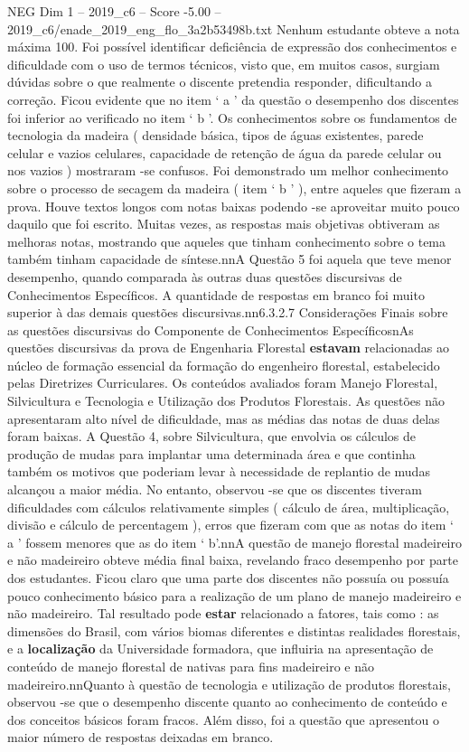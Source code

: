 \begin{textsample}{NEG Dim 1 – 2019\_c6 – Score -5.00 – 2019\_c6/enade\_2019\_eng\_flo\_3a2b53498b.txt}
Nenhum estudante obteve a nota máxima 100.
Foi possível identificar deficiência de expressão dos conhecimentos e dificuldade com o uso de termos técnicos, visto que, em muitos casos, surgiam dúvidas sobre o que realmente o discente pretendia responder, dificultando a correção.
Ficou evidente que no item ‘ a ’ da questão o desempenho dos discentes foi inferior ao verificado no item ‘ b ’.
Os conhecimentos sobre os fundamentos de tecnologia da madeira ( densidade básica, tipos de águas existentes, parede celular e vazios celulares, capacidade de retenção de água da parede celular ou nos vazios ) mostraram -se confusos.
Foi demonstrado um melhor conhecimento sobre o processo de secagem da madeira ( item ‘ b ’ ), entre aqueles que fizeram a prova.
Houve textos longos com notas baixas podendo -se aproveitar muito pouco daquilo que foi escrito.
Muitas vezes, as respostas mais objetivas obtiveram as melhoras notas, mostrando que aqueles que tinham conhecimento sobre o tema também tinham capacidade de síntese.nnA Questão 5 foi aquela que teve menor desempenho, quando comparada às outras duas questões discursivas de Conhecimentos Específicos.
A quantidade de respostas em branco foi muito superior à das demais questões discursivas.nn6.3.2.7 Considerações Finais sobre as questões discursivas do Componente de Conhecimentos EspecíficosnAs questões discursivas da prova de Engenharia Florestal \textbf{estavam} relacionadas ao núcleo de formação essencial da formação do engenheiro florestal, estabelecido pelas Diretrizes Curriculares.
Os conteúdos avaliados foram Manejo Florestal, Silvicultura e Tecnologia e Utilização dos Produtos Florestais.
As questões não apresentaram alto nível de dificuldade, mas as médias das notas de duas delas foram baixas.
A Questão 4, sobre Silvicultura, que envolvia os cálculos de produção de mudas para implantar uma determinada área e que continha também os motivos que poderiam levar à necessidade de replantio de mudas alcançou a maior média.
No entanto, observou -se que os discentes tiveram dificuldades com cálculos relativamente simples ( cálculo de área, multiplicação, divisão e cálculo de percentagem ), erros que fizeram com que as notas do item ‘ a ’ fossem menores que as do item ‘ b’.nnA questão de manejo florestal madeireiro e não madeireiro obteve média final baixa, revelando fraco desempenho por parte dos estudantes.
Ficou claro que uma parte dos discentes não possuía ou possuía pouco conhecimento básico para a realização de um plano de manejo madeireiro e não madeireiro.
Tal resultado pode \textbf{estar} relacionado a fatores, tais como : as dimensões do Brasil, com vários biomas diferentes e distintas realidades florestais, e a \textbf{localização} da Universidade formadora, que influiria na apresentação de conteúdo de manejo florestal de nativas para fins madeireiro e não madeireiro.nnQuanto à questão de tecnologia e utilização de produtos florestais, observou -se que o desempenho discente quanto ao conhecimento de conteúdo e dos conceitos básicos foram fracos.
Além disso, foi a questão que apresentou o maior número de respostas deixadas em branco.

\end{textsample}
